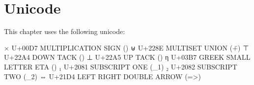 \hypertarget{unicode}{%
\section{Unicode}\label{unicode}}

This chapter uses the following unicode:

\begin{myDisplay}
×  U+00D7  MULTIPLICATION SIGN (\x)
⊎  U+228E  MULTISET UNION (\u+)
⊤  U+22A4  DOWN TACK (\top)
⊥  U+22A5  UP TACK (\bot)
η  U+03B7  GREEK SMALL LETTER ETA (\eta)
₁  U+2081  SUBSCRIPT ONE (\_1)
₂  U+2082  SUBSCRIPT TWO (\_2)
⇔  U+21D4  LEFT RIGHT DOUBLE ARROW (\<=>)
\end{myDisplay}

